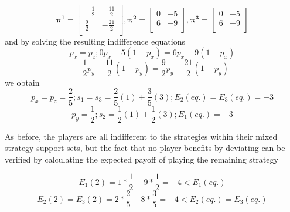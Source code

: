 \documentclass[12pt, a4paper]{article}
\begin{document}
\begin{equation}
    \boldsymbol{\pi^1}=\begin{bmatrix}
        -\frac{1}{2} & -\frac{11}{2} \\
        \frac{9}{2} & -\frac{21}{2} \\ 
    \end{bmatrix},
    \boldsymbol{\pi^2}=\begin{bmatrix}
        0 & -5 \\
        6 & -9 \\ 
    \end{bmatrix},
    \boldsymbol{\pi^3}=\begin{bmatrix}
        0 & -5 \\
        6 & -9 \\ 
    \end{bmatrix}
\end{equation}
and by solving the resulting indifference equations
\begin{equation}
    p_x=p_z;0p_x-5(1-p_x)=6p_x-9(1-p_x)
\end{equation}
\begin{equation}
    -\frac{1}{2}p_y-\frac{11}{2}(1-p_y)=\frac{9}{2}p_y-\frac{21}{2}(1-p_y)
\end{equation}
we obtain
\begin{equation}
    p_x=p_z=\frac{2}{5};s_1=s_3=\frac{2}{5}(1)+\frac{3}{5}(3);E_2(eq.)=E_3(eq.)=-3
\end{equation}
\begin{equation}
    p_y=\frac{1}{2};s_2=\frac{1}{2}(1)+\frac{1}{2}(3);E_1(eq.)=-3
\end{equation}

As before, the players are all indifferent to the strategies within their mixed strategy support sets, but the fact that no player benefits by deviating can be verified by calculating the expected payoff of playing the remaining strategy

\begin{equation}
    E_1(2)=1*\frac{1}{2}-9*\frac{1}{2}=-4<E_1(eq.)
\end{equation}
\begin{equation}
    E_2(2)=E_3(2)=2*\frac{2}{5}-8*\frac{3}{5}=-4<E_2(eq.)=E_3(eq.)
\end{equation}
\end{document}
